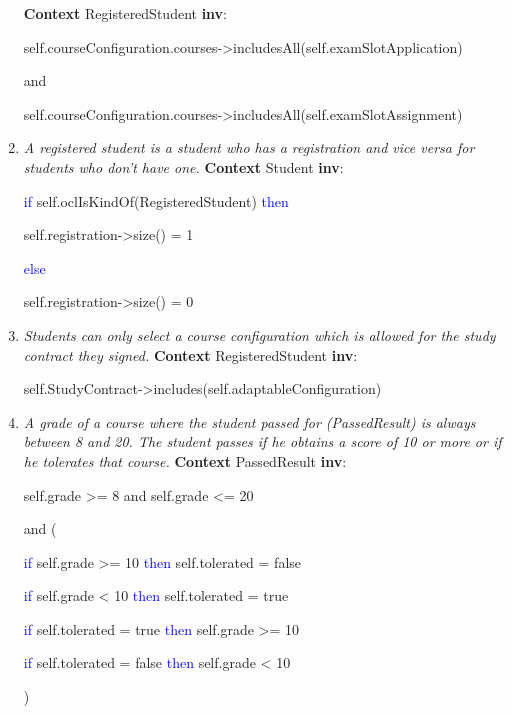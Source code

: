 \begin{enumerate}
	\npar \textbf{Context} RegisteredStudent \textbf{inv}:
	\par \hspace*{5 mm} self.courseConfiguration.courses->includesAll(self.examSlotApplication)
	\par \hspace*{5 mm} and
	\par \hspace*{5 mm} self.courseConfiguration.courses->includesAll(self.examSlotAssignment)
	
	\item  \emph{A registered student is a student who has a registration and vice
	versa for students who don't have one.}
	\npar \textbf{Context} Student \textbf{inv}:
	\par \hspace*{5 mm} \textcolor{Blue}{if}
	self.oclIsKindOf(RegisteredStudent) \textcolor{Blue}{then}
	\par \hspace*{10 mm} self.registration->size() = 1
	\par \hspace*{5 mm} \textcolor{Blue}{else}
	\par \hspace*{10 mm} self.registration->size() = 0
	
	\item \emph{Students can only select a course configuration which is allowed
	for the study contract they signed.}
	\npar \textbf{Context} RegisteredStudent \textbf{inv}:
	\par \hspace*{5 mm} self.StudyContract->includes(self.adaptableConfiguration)
	
	\item \emph{A grade of a course where the student passed for (PassedResult) is
	always between 8 and 20. The student passes if he obtains a score of 10 or
	more or if he tolerates that course.}
	\npar \textbf{Context} PassedResult \textbf{inv}:
	\par \hspace*{5 mm} self.grade >= 8 and self.grade <= 20
	\par \hspace*{5 mm} and (
	\par \hspace*{10 mm} \textcolor{Blue}{if} self.grade >= 10
	\textcolor{Blue}{then} self.tolerated = false 
	\par \hspace*{10 mm} \textcolor{Blue}{if} self.grade < 10 \textcolor{Blue}{then}
	self.tolerated = true 
	\par \hspace*{10 mm} \textcolor{Blue}{if} self.tolerated = true \textcolor{Blue}{then} self.grade >= 10
	\par \hspace*{10 mm} \textcolor{Blue}{if} self.tolerated = false \textcolor{Blue}{then} self.grade < 10
	\par \hspace*{5 mm} )
	

\end{enumerate}
